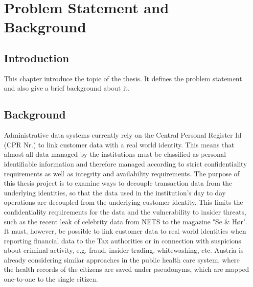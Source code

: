 \chapter{Problem Statement and Background}

\section{Introduction}
This chapter introduce the topic of the thesis. It defines the problem statement and also give a brief background about it.
\section{Background}
Administrative data systems currently rely on the Central Personal Register Id (CPR Nr.) to link customer data with a real world identity. This means that almost all data managed by the institutions must be classified as personal identifiable information and therefore managed according to strict confidentiality requirements as well as integrity and availability requirements. The purpose of this thesis project is to examine ways to decouple transaction data from the underlying identities, so that the data used in the institution's day to day operations are decoupled from the underlying customer identity. This limits the confidentiality requirements for the data and the vulnerability to insider threats, such as the recent leak of celebrity data from NETS to the magazine "Se \& Hør". It must, however, be possible to link customer data to real world identities when reporting financial data to the Tax authorities or in connection with suspicions about criminal activity, e.g. fraud, insider trading, whitewashing, etc. Austria is already considering similar approaches in the public health care system, where the health records of the citizens are saved under pseudonyms, which are mapped one-to-one to the single citizen.
